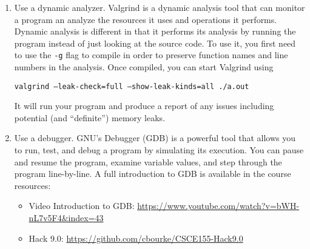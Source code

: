 \documentclass[12pt]{scrartcl}
\begin{document}
\begin{enumerate}
\begin{itemize}
  \end{itemize}
  
  \item Use a dynamic analyzer.  Valgrind is a dynamic analysis tool 
  that can monitor a program an analyze the resources it uses and
  operations it performs.  Dynamic analysis is different in that it
  performs its analysis by running the program instead of just looking
  at the source code.  To use it, you first need to use the 
  \texttt{-g} flag to compile in order to preserve function
  names and line numbers in the analysis.  Once compiled, you can start
  Valgrind using
  
  \texttt{valgrind --leak-check=full --show-leak-kinds=all ./a.out}

  It will run your program and produce a report of any issues including
  potential (and ``definite'') memory leaks.

  \item Use a debugger.  GNU's Debugger (GDB) is a powerful tool that
  allows you to run, test, and debug a program by simulating its execution.
  You can pause and resume the program, examine variable values, and
  step through the program line-by-line.  A full introduction to GDB
  is available in the course resources:
  \begin{itemize}
    \item Video Introduction to GDB: \url{https://www.youtube.com/watch?v=bWH-nL7v5F4&index=43}
    \item Hack 9.0: \url{https://github.com/cbourke/CSCE155-Hack9.0}
  \end{itemize}
  

\end{enumerate}
\end{document}
